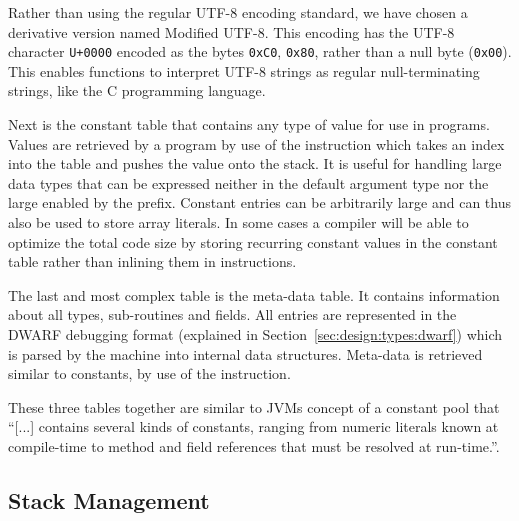 Rather than using the regular UTF-8 encoding standard, we have chosen a
derivative version named Modified UTF-8. This encoding has the UTF-8 character
{\tt U+0000} encoded as the bytes {\tt 0xC0}, {\tt 0x80}, rather than a null
byte ({\tt 0x00}). This enables functions to interpret UTF-8 strings as regular
null-terminating strings, like the C programming language. %

Next is the constant table that contains any type of value for use in
programs. Values are retrieved by a program by use of the 
instruction which takes an index into the table and pushes the value onto the
stack. It is useful for handling large data types that can be expressed neither
in the default  argument type nor the large  enabled by
the  prefix. Constant entries can be arbitrarily large and can thus
also be used to store array literals. In some cases a compiler will be able to
optimize the total code size by storing recurring constant values in the
constant table rather than inlining them in instructions.

The last and most complex table is the meta-data table. It contains information
about all types, sub-routines and fields. All entries are represented in the
DWARF debugging format (explained in Section~\ref{sec:design:types:dwarf}) which
is parsed by the machine into internal data structures. Meta-data is retrieved
similar to constants, by use of the  instruction.

These three tables together are similar to JVMs concept of a constant pool that
``[...] contains several kinds of constants, ranging from numeric literals known
at compile-time to method and field references that must be resolved at
run-time.''\cite[Section 2.5.5]{jvm-spec}.

\subsection{Stack Management}
\label{sec:design:stack-mgmt}

